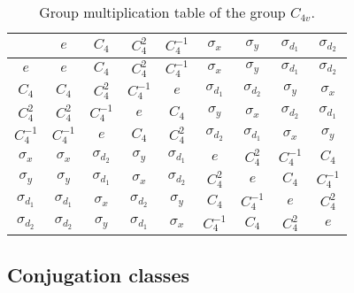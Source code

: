 \begin{table}
    \centering
    \caption{Group multiplication table of the group $C_{4v}$.}
    \begin{tabular}{c|cccc|cccc}
        & $e$ & $C_4$ &$C_4^2$ & $C_4^{-1}$ & $\sigma_x$ & $\sigma_y$ & $\sigma_{d_1}$ & $\sigma_{d_2}$\\ \hline
        $e$ & $e$ & $C_4$ & $C_4^2$ & $C_4^{-1}$ & $\sigma_x$ & $\sigma_y$ & $\sigma_{d_1}$ & $\sigma_{d_2}$\\
        $C_4$ & $C_4$ & $C_4^2$ & $C_4^{-1}$ & $e$ & $\sigma_{d_1}$ & $\sigma_{d_2}$ & $\sigma_y$ & $\sigma_x$\\
        $C_4^2$ & $C_4^2$ & $C_4^{-1}$ & $e$ & $C_4$ & $\sigma_y$ & $\sigma_x$ & $\sigma_{d_2}$ & $\sigma_{d_1}$\\
        $C_4^{-1}$ & $C_4^{-1}$ & $e$ & $C_4$ & $C_4^2$ & $\sigma_{d_2}$ & $\sigma_{d_1}$ & $\sigma_x$ & $\sigma_y$\\ \hline
        $\sigma_x$ & $\sigma_x$ & $\sigma_{d_2}$ & $\sigma_y$ & $\sigma_{d_1}$ & $e$ & $C_4^2$ & $C_4^{-1}$ & $C_4$\\
        $\sigma_y$ & $\sigma_y$ & $\sigma_{d_1}$ & $\sigma_x$ & $\sigma_{d_2}$ & $C_4^2$ & $e$ & $C_4$ & $C_4^{-1}$\\
        $\sigma_{d_1}$ & $\sigma_{d_1}$ & $\sigma_x$ & $\sigma_{d_2}$ & $\sigma_y$ & $C_4$ & $C_4^{-1}$ & $e$ & $C_4^2$\\
        $\sigma_{d_2}$ & $\sigma_{d_2}$ & $\sigma_y$ & $\sigma_{d_1}$ & $\sigma_x$ & $C_4^{-1}$ & $C_4$ & $C_4^2$ & $e$
    \end{tabular}
    \label{tab:Group:Symm:multTab}
\end{table}

\subsection{Conjugation classes}


